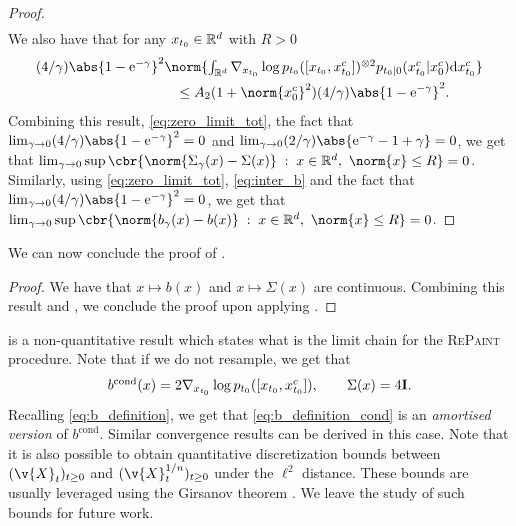 \begin{proof}
\begin{align}
	\end{align}
	We also have that for any $x_{t_0} \in \mathbb{R}^d$ with $R > 0$ \begin{align}  & \textstyle (4/\gamma)\abs{1 - \mathrm{e}^{-\gamma}}^2 \norm{ \int_{\R^d} \nabla_{x_{t_0}} \log p_{t_0}([x_{t_0}, x_{t_0}^c])^{\otimes 2} p_{t_0|0}(x_{t_0}^c|x_0^c) \mathrm{d} x_{t_0}^c} \\ &\qquad \qquad \qquad \qquad \qquad \leq A_2(1+\norm{x_0^c}^2) (4/\gamma)\abs{1 - \mathrm{e}^{-\gamma}}^2 .
	\end{align}
	Combining this result, \eqref{eq:zero_limit_tot}, the fact that $\lim_{\gamma \to 0} (4/\gamma)\abs{1 - \mathrm{e}^{-\gamma}}^2 = 0$ and $\lim_{\gamma \to 0} (2/\gamma)\abs{\mathrm{e}^{-\gamma}-1+\gamma} = 0$, we get that $\lim_{\gamma \to 0} \sup \cbr{\norm{\Sigma_\gamma(x) - \Sigma(x)}\; : \; x \in \R^d, \ \norm{x} \leq R} = 0$.
	Similarly, using \eqref{eq:zero_limit_tot}, \eqref{eq:inter_b} and the fact that $\lim_{\gamma \to 0} (4/\gamma)\abs{1 - \mathrm{e}^{-\gamma}}^2 = 0$, we get that $\lim_{\gamma \to 0} \sup \cbr{\norm{b_\gamma(x) - b(x)} \; : \; x \in \R^d, \ \norm{x} \leq R} = 0$.
\end{proof}

We can now conclude the proof of .

\begin{proof}
	We have that $x\mapsto b(x)$ and $x \mapsto \Sigma(x)$ are continuous.
	Combining this result and , we conclude the proof upon applying \textcite[Theorem 11.2.3]{stroock2007multidimensional}.
\end{proof}

 is a non-quantitative result which states what is
the limit chain for the \textsc{RePaint} procedure.
Note that if we do not resample, we get that \begin{equation} \label{eq:b_definition_cond} \textstyle b^{\mathrm{cond}}(x) = 2 \nabla_{x_{t_0}} \log p_{t_0}([x_{t_0}, x_{t_0}^c]) , \qquad \Sigma(x) = 4 \m{I} .
\end{equation}
Recalling \eqref{eq:b_definition}, we get that \eqref{eq:b_definition_cond} is an \emph{amortised version} of $b^{\mathrm{cond}}$.
Similar convergence results can be derived in this case.
Note that it is also possible to obtain quantitative discretization bounds between $(\v{X}_t)_{t \geq 0}$ and $(\v{X}_t^{1/n})_{t \geq 0}$ under the $\ell^2$ distance.
These bounds are usually leveraged using the Girsanov theorem \cite{durmus2017nonasymp,dalalyan2017theoretical}.
We leave the study of such bounds for future work.

